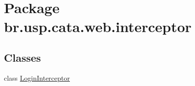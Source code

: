 \hypertarget{namespacebr_1_1usp_1_1cata_1_1web_1_1interceptor}{\section{Package br.\+usp.\+cata.\+web.\+interceptor}
\label{namespacebr_1_1usp_1_1cata_1_1web_1_1interceptor}
}
\subsection*{Classes}
\begin{DoxyCompactItemize}
\item 
class \hyperlink{classbr_1_1usp_1_1cata_1_1web_1_1interceptor_1_1_login_interceptor}{Login\+Interceptor}
\end{DoxyCompactItemize}
